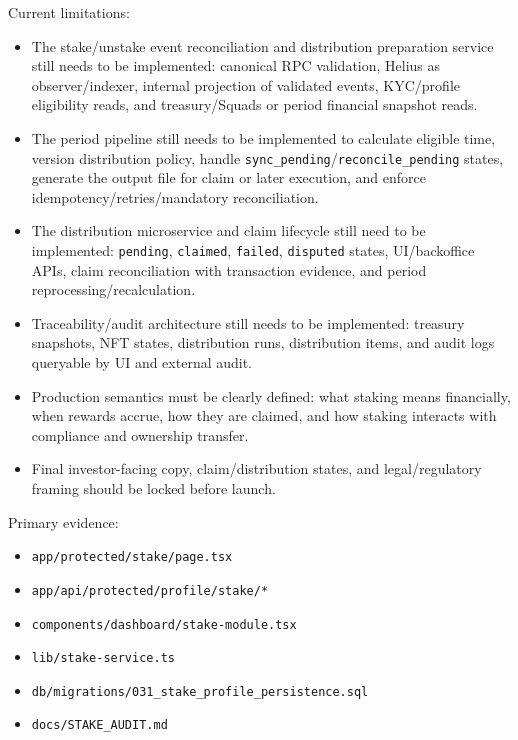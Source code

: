 \documentclass[
  10pt,
  letterpaper,
]{article}
\providecommand{\tightlist}{%
  \setlength{\itemsep}{0pt}\setlength{\parskip}{0pt}}
\let\oldtexttt\texttt
\renewcommand{\texttt}[1]{\oldtexttt{\small #1}}
\begin{document}
Current limitations:

\begin{itemize}
\tightlist
\item
  The stake/unstake event reconciliation and distribution preparation
  service still needs to be implemented: canonical RPC validation,
  Helius as observer/indexer, internal projection of validated events,
  KYC/profile eligibility reads, and treasury/Squads or period financial
  snapshot reads.
\item
  The period pipeline still needs to be implemented to calculate
  eligible time, version distribution policy, handle
  \texttt{sync\_pending}/\texttt{reconcile\_pending} states, generate
  the output file for claim or later execution, and enforce
  idempotency/retries/mandatory reconciliation.
\item
  The distribution microservice and claim lifecycle still need to be
  implemented: \texttt{pending}, \texttt{claimed}, \texttt{failed},
  \texttt{disputed} states, UI/backoffice APIs, claim reconciliation
  with transaction evidence, and period reprocessing/recalculation.
\item
  Traceability/audit architecture still needs to be implemented:
  treasury snapshots, NFT states, distribution runs, distribution items,
  and audit logs queryable by UI and external audit.
\item
  Production semantics must be clearly defined: what staking means
  financially, when rewards accrue, how they are claimed, and how
  staking interacts with compliance and ownership transfer.
\item
  Final investor-facing copy, claim/distribution states, and
  legal/regulatory framing should be locked before launch.
\end{itemize}

Primary evidence:

\begin{itemize}
\tightlist
\item
  \texttt{app/protected/stake/page.tsx}
\item
  \texttt{app/api/protected/profile/stake/*}
\item
  \texttt{components/dashboard/stake-module.tsx}
\item
  \texttt{lib/stake-service.ts}
\item
  \texttt{db/migrations/031\_stake\_profile\_persistence.sql}
\item
  \texttt{docs/STAKE\_AUDIT.md}
\end{itemize}
\end{document}
